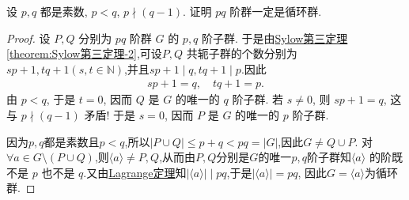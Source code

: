\documentclass[../../main.tex]{subfiles}%
\begin{document}
\begin{proposition}\label{proposition:阶为特定素数乘积的群必为循环群}
设 $p,q$ 都是素数, $p<q$, $p\nmid (q-1)$. 证明 $pq$ 阶群一定是循环群.
\end{proposition}
\begin{proof}
设 $P,Q$ 分别为 $pq$ 阶群 $G$ 的 $p,q$ 阶子群. 于是由\hyperref[theorem:Sylow第三定理-2]{Sylow第三定理\ref{theorem:Sylow第三定理-2}},可设$P,Q$ 共轭子群的个数分别为$sp+1,tq+1(s,t\in \mathbb{N})$,并且$sp+1\mid q,tq+1\mid p$.因此
\begin{align*}
sp+1=q,\quad tq+1=p.
\end{align*}
由 $p<q$, 于是 $t=0$, 因而 $Q$ 是 $G$ 的唯一的 $q$ 阶子群. 若 $s\neq 0$, 则 $sp+1=q$, 这与 $p\nmid (q-1)$ 矛盾! 于是 $s=0$, 因而 $P$ 是 $G$ 的唯一的 $p$ 阶子群.

因为$p,q$都是素数且$p<q$,所以$|P\cup Q|\leqslant p+q<pq=|G|$,因此$G\neq Q\cup P$. 对$\forall a \in G\setminus (P\cup Q)$,则$\langle a\rangle \neq P,Q$,从而由$P,Q$分别是$G$的唯一$p,q$阶子群知$\langle a\rangle$ 的阶既不是 $p$ 也不是 $q$.又由\hyperref[theorem:抽象代数--Lagrange定理]{Lagrange定理}知$|\langle a\rangle|\mid pq$,于是$|\langle a\rangle|=pq$, 因此$G=\langle a\rangle$为循环群.
\end{proof}
\end{document}
